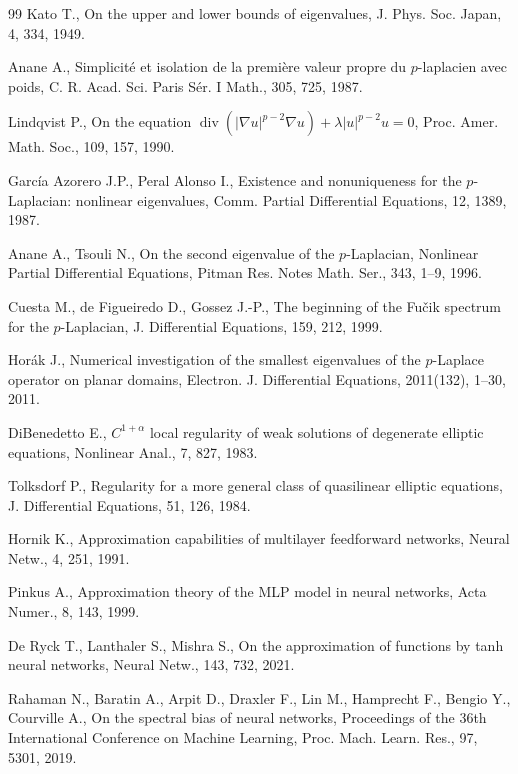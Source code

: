 \documentclass[10pt]{amsart}
\theoremstyle{definition}
\theoremstyle{remark}
\theoremstyle{plain}
\begin{document}
\begin{thebibliography}{99}
Kato T., On the upper and lower bounds of eigenvalues, J. Phys. Soc. Japan, 4, 334, 1949.

Anane A., Simplicit\'e et isolation de la premi\`ere valeur propre du $p$-laplacien avec poids,
C. R. Acad. Sci. Paris S\'er. I Math., 305, 725, 1987.

Lindqvist P., On the equation $\operatorname{div}(|\nabla u|^{p-2}\nabla u)+\lambda|u|^{p-2}u=0$,
Proc. Amer. Math. Soc., 109, 157, 1990.

Garc\'ia Azorero J.P., Peral Alonso I., Existence and nonuniqueness for the $p$-Laplacian: nonlinear
eigenvalues, Comm. Partial Differential Equations, 12, 1389, 1987.

Anane A., Tsouli N., On the second eigenvalue of the $p$-Laplacian, Nonlinear Partial Differential
Equations, Pitman Res. Notes Math. Ser., 343, 1--9, 1996.

Cuesta M., de Figueiredo D., Gossez J.-P., The beginning of the Fu\v{c}ik spectrum for the
$p$-Laplacian, J. Differential Equations, 159, 212, 1999.

Hor\'ak J., Numerical investigation of the smallest eigenvalues of the $p$-Laplace operator on planar
domains, Electron. J. Differential Equations, 2011(132), 1--30, 2011.

DiBenedetto E., $C^{1+\alpha}$ local regularity of weak solutions of degenerate elliptic equations,
Nonlinear Anal., 7, 827, 1983.

Tolksdorf P., Regularity for a more general class of quasilinear elliptic equations, J. Differential
Equations, 51, 126, 1984.

Hornik K., Approximation capabilities of multilayer feedforward networks, Neural Netw., 4, 251, 1991.

Pinkus A., Approximation theory of the MLP model in neural networks, Acta Numer., 8, 143, 1999.

De Ryck T., Lanthaler S., Mishra S., On the approximation of functions by tanh neural networks,
Neural Netw., 143, 732, 2021.

Rahaman N., Baratin A., Arpit D., Draxler F., Lin M., Hamprecht F., Bengio Y., Courville A., On the
spectral bias of neural networks, Proceedings of the 36th International Conference on Machine
Learning, Proc. Mach. Learn. Res., 97, 5301, 2019.

\end{thebibliography}
\end{document}
